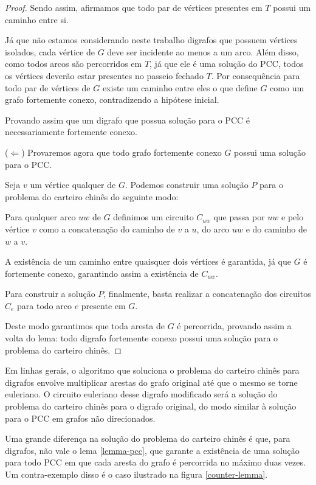 \documentclass[12pt, a4paper]{article}
\begin{document}
\begin{proof}
        Sendo assim, afirmamos que todo par de vértices presentes em $T$ possui um caminho entre si.

        Já que não estamos considerando neste trabalho digrafos que possuem vértices isolados, cada vértice de $G$ deve ser incidente ao menos a um arco. Além disso, como todos arcos são percorridos em $T$, já que ele é uma solução do PCC, todos os vértices deverão estar presentes no passeio fechado $T$.
        Por consequência para todo par de vértices de $G$ existe um caminho entre eles o que define $G$ como um grafo fortemente conexo, contradizendo a hipótese inicial.

        Provando assim que um digrafo que possua solução para o PCC é necessariamente fortemente conexo. 

        ($\Leftarrow$)  Provaremos agora que todo grafo fortemente conexo $G$ possui uma solução para o PCC.

        Seja $v$ um vértice qualquer de $G$. Podemos construir uma solução $P$ para o problema do carteiro chinês do seguinte modo:


        Para qualquer arco $uw$ de $G$ definimos um circuito $C_{uw}$ que passa por $uw$ e pelo vértice $v$ como a concatenação do caminho de $v$ a $u$, do arco $uw$ e do caminho de $w$ a $v$.
        
        A existência de um caminho entre quaisquer dois vértices é garantida, já que $G$ é fortemente conexo, garantindo assim a existência de $C_{uw}$.
        
        Para construir a solução $P$, finalmente, basta realizar a concatenação dos circuitos $C_{e}$ para todo arco $e$ presente em $G$.

        Deste modo garantimos que toda aresta de $G$ é percorrida, provando assim a volta do lema: todo digrafo fortemente conexo possui uma solução para o problema do carteiro chinês.

    \end{proof}

    Em linhas gerais, o algoritmo que soluciona o problema do carteiro chinês para digrafos envolve multiplicar arestas do grafo original até que o mesmo se torne euleriano. O circuito euleriano desse digrafo modificado será a solução do problema do carteiro chinês para o digrafo original, do modo similar à solução para o PCC em grafos não direcionados.
    
    Uma grande diferença na solução do problema do carteiro chinês é que, para digrafos, não vale o lema \ref{lemma-pcc}, que garante a existência de uma solução para todo PCC em que cada aresta do grafo é percorrida no máximo duas vezes.
    Um contra-exemplo disso é o caso ilustrado na figura \ref{counter-lemma}. 
\end{document}
